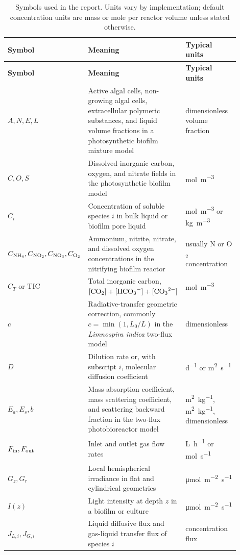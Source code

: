 \documentclass[11pt]{article}
\newcommand{\Limno}{\textit{Limnospira indica}}
\newcommand{\TIC}{\ensuremath{\mathrm{TIC}}}
\begin{document}
\begin{longtable}{P{0.18\linewidth}P{0.47\linewidth}P{0.25\linewidth}}
\caption{Symbols used in the report. Units vary by implementation; default concentration units are mass or mole per reactor volume unless stated otherwise.}\\
\toprule
\textbf{Symbol} & \textbf{Meaning} & \textbf{Typical units}\\
\midrule
\endfirsthead
\toprule
\textbf{Symbol} & \textbf{Meaning} & \textbf{Typical units}\\
\midrule
\endhead
$A,N,E,L$ & Active algal cells, non-growing algal cells, extracellular polymeric substances, and liquid volume fractions in a photosynthetic biofilm mixture model & dimensionless volume fraction\\
$C,O,S$ & Dissolved inorganic carbon, oxygen, and nitrate fields in the photosynthetic biofilm model & \si{mol.m^{-3}}\\
$C_i$ & Concentration of soluble species $i$ in bulk liquid or biofilm pore liquid & \si{mol.m^{-3}} or \si{kg.m^{-3}}\\
$C_{\ce{NH4}}, C_{\ce{NO2}}, C_{\ce{NO3}}, C_{\ce{O2}}$ & Ammonium, nitrite, nitrate, and dissolved oxygen concentrations in the nitrifying biofilm reactor & usually N or O$_2$ concentration\\
$C_T$ or \TIC{} & Total inorganic carbon, $[\ce{CO2}]+[\ce{HCO3-}]+[\ce{CO3^{2-}}]$ & \si{mol.m^{-3}}\\
$c$ & Radiative-transfer geometric correction, commonly $c=\min(1,L_0/L)$ in the \Limno{} two-flux model & dimensionless\\
$D$ & Dilution rate or, with subscript $i$, molecular diffusion coefficient & \si{d^{-1}} or \si{m^2.s^{-1}}\\
$E_a,E_s,b$ & Mass absorption coefficient, mass scattering coefficient, and scattering backward fraction in the two-flux photobioreactor model & \si{m^2.kg^{-1}}, \si{m^2.kg^{-1}}, dimensionless\\
$F_{\rm in},F_{\rm out}$ & Inlet and outlet gas flow rates & \si{L.h^{-1}} or \si{mol.s^{-1}}\\
$G_z,G_r$ & Local hemispherical irradiance in flat and cylindrical geometries & \si{\micro mol.m^{-2}.s^{-1}}\\
$I(z)$ & Light intensity at depth $z$ in a biofilm or culture & \si{\micro mol.m^{-2}.s^{-1}}\\
$J_{L,i},J_{G,i}$ & Liquid diffusive flux and gas-liquid transfer flux of species $i$ & concentration flux\\

\end{longtable}
\end{document}
